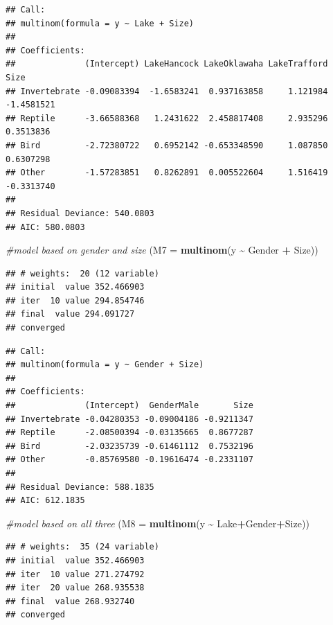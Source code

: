 \documentclass[
]{article}
\newenvironment{Shaded}{\begin{snugshade}}{\end{snugshade}}
\newcommand{\AttributeTok}[1]{\textcolor[rgb]{0.13,0.29,0.53}{#1}}
\newcommand{\CommentTok}[1]{\textcolor[rgb]{0.56,0.35,0.01}{\textit{#1}}}
\newcommand{\FunctionTok}[1]{\textcolor[rgb]{0.13,0.29,0.53}{\textbf{#1}}}
\newcommand{\NormalTok}[1]{#1}
\newcommand{\SpecialCharTok}[1]{\textcolor[rgb]{0.81,0.36,0.00}{\textbf{#1}}}
\begin{document}
\begin{verbatim}
## Call:
## multinom(formula = y ~ Lake + Size)
## 
## Coefficients:
##              (Intercept) LakeHancock LakeOklawaha LakeTrafford       Size
## Invertebrate -0.09083394  -1.6583241  0.937163858     1.121984 -1.4581521
## Reptile      -3.66588368   1.2431622  2.458817408     2.935296  0.3513836
## Bird         -2.72380722   0.6952142 -0.653348590     1.087850  0.6307298
## Other        -1.57283851   0.8262891  0.005522604     1.516419 -0.3313740
## 
## Residual Deviance: 540.0803 
## AIC: 580.0803
\end{verbatim}

\begin{Shaded}
\begin{Highlighting}[]
\CommentTok{\#model based on gender and size}
\NormalTok{(}\AttributeTok{M7 =} \FunctionTok{multinom}\NormalTok{(y }\SpecialCharTok{\textasciitilde{}}\NormalTok{ Gender }\SpecialCharTok{+}\NormalTok{ Size))}
\end{Highlighting}
\end{Shaded}

\begin{verbatim}
## # weights:  20 (12 variable)
## initial  value 352.466903 
## iter  10 value 294.854746
## final  value 294.091727 
## converged
\end{verbatim}

\begin{verbatim}
## Call:
## multinom(formula = y ~ Gender + Size)
## 
## Coefficients:
##              (Intercept)  GenderMale       Size
## Invertebrate -0.04280353 -0.09004186 -0.9211347
## Reptile      -2.08500394 -0.03135665  0.8677287
## Bird         -2.03235739 -0.61461112  0.7532196
## Other        -0.85769580 -0.19616474 -0.2331107
## 
## Residual Deviance: 588.1835 
## AIC: 612.1835
\end{verbatim}

\begin{Shaded}
\begin{Highlighting}[]
\CommentTok{\#model based on all three}
\NormalTok{(}\AttributeTok{M8 =} \FunctionTok{multinom}\NormalTok{(y }\SpecialCharTok{\textasciitilde{}}\NormalTok{ Lake}\SpecialCharTok{+}\NormalTok{Gender}\SpecialCharTok{+}\NormalTok{Size))}
\end{Highlighting}
\end{Shaded}

\begin{verbatim}
## # weights:  35 (24 variable)
## initial  value 352.466903 
## iter  10 value 271.274792
## iter  20 value 268.935538
## final  value 268.932740 
## converged
\end{verbatim}
\end{document}
